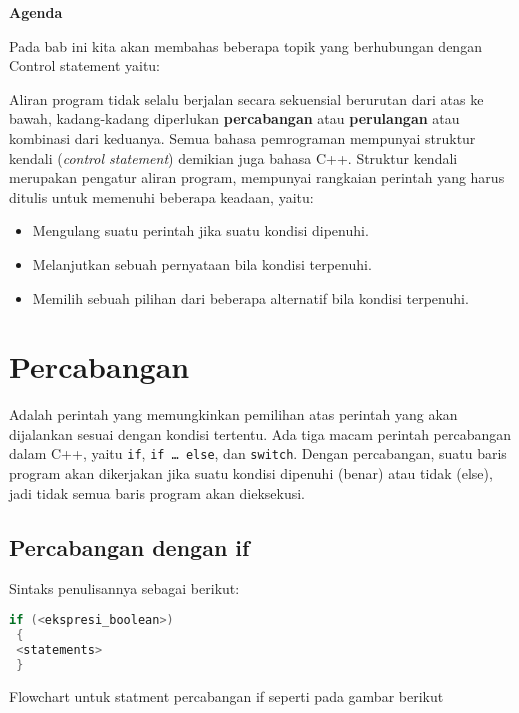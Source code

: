 \textbf{Agenda}

Pada bab ini kita akan membahas beberapa topik yang berhubungan dengan Control statement yaitu:

\minitoc

Aliran program tidak selalu berjalan secara sekuensial berurutan dari
atas ke bawah, kadang-kadang diperlukan \textbf{percabangan} atau
\textbf{perulangan} atau kombinasi dari keduanya. Semua bahasa
pemrograman mempunyai struktur kendali (\emph{control statement})
demikian juga bahasa C++. Struktur kendali merupakan pengatur aliran
program, mempunyai rangkaian perintah yang harus ditulis untuk memenuhi
beberapa keadaan, yaitu:

\begin{itemize}

\item
  Mengulang suatu perintah jika suatu kondisi dipenuhi.
\item
  Melanjutkan sebuah pernyataan bila kondisi terpenuhi.
\item
  Memilih sebuah pilihan dari beberapa alternatif bila kondisi
  terpenuhi.
\end{itemize}

\section{Percabangan}\label{percabangan}

Adalah perintah yang memungkinkan pemilihan atas perintah yang akan
dijalankan sesuai dengan kondisi tertentu. Ada tiga macam perintah
percabangan dalam C++, yaitu \texttt{if}, \texttt{if\ \ldots{}\ else},
dan \texttt{switch}. Dengan percabangan, suatu baris program akan
dikerjakan jika suatu kondisi dipenuhi (benar) atau tidak (else), jadi
tidak semua baris program akan dieksekusi.

\subsection{Percabangan dengan if}\label{percabangan-dengan-if}

Sintaks penulisannya sebagai berikut:

\begin{lstlisting}[language=c++, numbers=none]
 if (<ekspresi_boolean>)
 {
 <statements>
 }
\end{lstlisting}

Flowchart untuk statment percabangan if seperti pada gambar berikut




